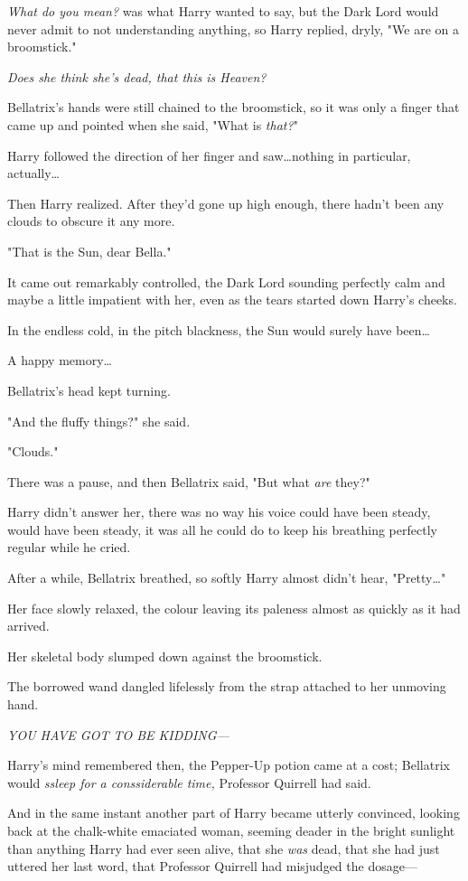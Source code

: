 \emph{What do you mean?} was what Harry wanted to say, but the Dark Lord would
never admit to not understanding anything, so Harry replied, dryly, "We are on
a broomstick."

\emph{Does she think she’s dead, that this is Heaven?}

Bellatrix’s hands were still chained to the broomstick, so it was only a finger
that came up and pointed when she said, "What is \emph{that?}"

Harry followed the direction of her finger and saw…nothing in
particular, actually…

Then Harry realized. After they’d gone up high enough, there hadn’t been any
clouds to obscure it any more.

"That is the Sun, dear Bella."

It came out remarkably controlled, the Dark Lord sounding perfectly calm and
maybe a little impatient with her, even as the tears started down Harry’s
cheeks.

In the endless cold, in the pitch blackness, the Sun would surely have
been…

A happy memory…

Bellatrix’s head kept turning.

"And the fluffy things?" she said.

"Clouds."

There was a pause, and then Bellatrix said, "But what \emph{are} they?"

Harry didn’t answer her, there was no way his voice could have been steady,
would have been steady, it was all he could do to keep his breathing perfectly
regular while he cried.

After a while, Bellatrix breathed, so softly Harry almost didn’t hear,
"Pretty…"

Her face slowly relaxed, the colour leaving its paleness almost as quickly as it
had arrived.

Her skeletal body slumped down against the broomstick.

The borrowed wand dangled lifelessly from the strap attached to her unmoving
hand.

\emph{YOU HAVE GOT TO BE KIDDING—}

Harry’s mind remembered then, the Pepper-Up potion came at a cost; Bellatrix
would \emph{ssleep for a conssiderable time,} Professor Quirrell had said.

And in the same instant another part of Harry became utterly convinced, looking
back at the chalk-white emaciated woman, seeming deader in the bright sunlight
than anything Harry had ever seen alive, that she \emph{was} dead, that she had
just uttered her last word, that Professor Quirrell had misjudged the dosage—

